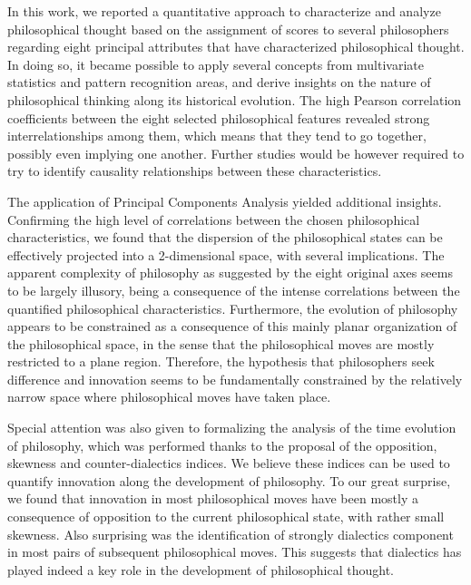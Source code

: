 \documentclass[%
 aip,
 jmp,%
 amsmath,amssymb,
 reprint,%
]{revtex4-1}
\begin{document}
In this work, we reported a quantitative approach to characterize and
analyze philosophical thought based on the assignment of scores to
several philosophers regarding eight principal attributes that have
characterized philosophical thought.  In doing so, it became possible
to apply several concepts from multivariate statistics and pattern
recognition areas, and derive insights on the nature of philosophical
thinking along its historical evolution.  The high Pearson correlation
coefficients between the eight selected philosophical features
revealed strong interrelationships among them, which means that they
tend to go together, possibly even implying one another.  Further
studies would be however required to try to identify causality
relationships between these characteristics.

The application of Principal Components Analysis yielded additional
insights.  Confirming the high level of correlations between the
chosen philosophical characteristics, we found that the dispersion of
the philosophical states can be effectively projected into a
2-dimensional space, with several implications.  The apparent
complexity of philosophy as suggested by the eight original axes seems
to be largely illusory, being a consequence of the intense
correlations between the quantified philosophical characteristics.
Furthermore, the evolution of philosophy appears to be constrained as
a consequence of this mainly planar organization of the philosophical
space, in the sense that the philosophical moves are mostly restricted
to a plane region. Therefore, the hypothesis that philosophers seek
difference and innovation seems to be fundamentally constrained by the
relatively narrow space where philosophical moves have taken place.

Special attention was also given to formalizing the analysis of the
time evolution of philosophy, which was performed thanks to the
proposal of the opposition, skewness and counter-dialectics indices.
We believe these indices can be used to quantify innovation along the
development of philosophy.  To our great surprise, we found that
innovation in most philosophical moves have been mostly a consequence
of opposition to the current philosophical state, with rather small
skewness.  Also surprising was the identification of strongly
dialectics component in most pairs of subsequent philosophical moves.
This suggests that dialectics has played indeed a key role in the
development of philosophical thought.
\end{document}
